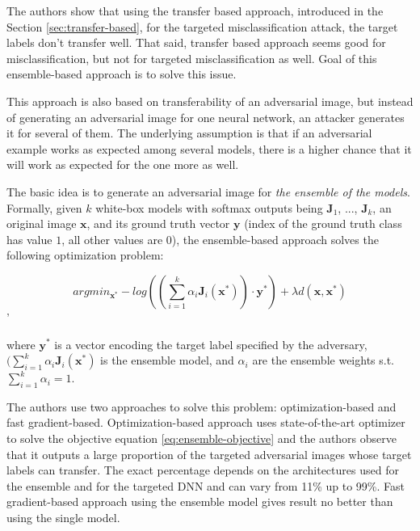 The authors \cite{ensemble-attack} show that using the transfer based approach, introduced in the Section \ref{sec:transfer-based}, for the targeted misclassification attack, the target labels don't transfer well. That said, transfer based approach seems good for misclassification, but not for targeted misclassification as well. Goal of this ensemble-based approach is to solve this issue.

This approach is also based on transferability of an adversarial image, but instead of generating an adversarial image for one neural network, an attacker generates it for several of them. The underlying assumption is that if an adversarial example works as expected among several models, there is a higher chance that it will work as expected for the one more as well. 

The basic idea is to generate an adversarial image for \textit{the ensemble of the models}. Formally, given $k$ white-box models with softmax outputs being $\pmb J_1$, ..., $\pmb J_k$, an original image $\pmb x$, and its ground truth vector $\pmb y$ (index of the ground truth class has value $1$, all other values are $0$), the ensemble-based approach solves the following optimization problem:

\begin{equation}\label{eq:ensemble-objective}
argmin_{\pmb x^*} - log ((\sum_{i=1}^k \alpha_i \pmb J_i(\pmb x^*)) \cdot \pmb y^*) + \lambda d(\pmb x, \pmb x^*)
\end{equation}
'

where $\pmb y^*$ is a vector encoding the target label specified by the adversary, $(\sum_{i=1}^k \alpha_i \pmb J_i(\pmb x^*)$ is the ensemble model, and $\alpha_i$ are the ensemble weights s.t. $\sum_{i=1}^k \alpha_i = 1$.

The authors use two approaches to solve this problem: optimization-based and fast gradient-based. Optimization-based approach uses state-of-the-art optimizer to solve the objective equation \ref{eq:ensemble-objective} and the authors observe that it outputs  a large proportion of the targeted adversarial images whose target labels can transfer. The exact percentage depends on the architectures used for the ensemble and for the targeted DNN and can vary from 11\% up to 99\%. Fast gradient-based approach using the ensemble model gives result no better than using the single model.